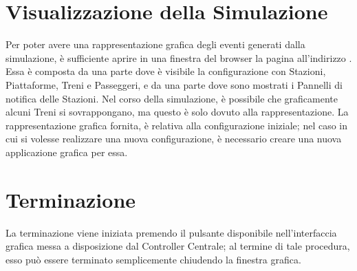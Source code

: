 	\section{Visualizzazione della Simulazione}
	
	Per poter avere una rappresentazione grafica degli eventi generati dalla simulazione, è sufficiente aprire in una finestra del browser  la pagina all'indirizzo . Essa è composta da una parte dove è visibile la configurazione con Stazioni, Piattaforme, Treni e Passeggeri, e da una parte dove sono mostrati i Pannelli di notifica delle Stazioni. Nel corso della simulazione, è possibile che graficamente alcuni Treni si sovrappongano, ma questo è solo dovuto alla rappresentazione.
	La rappresentazione grafica fornita, è relativa alla configurazione iniziale; nel caso in cui si volesse realizzare una nuova configurazione, è necessario creare una nuova applicazione grafica per essa.
	
	\section{Terminazione}
	
	La terminazione viene iniziata premendo il pulsante  disponibile nell'interfaccia grafica messa a disposizione dal Controller Centrale; al termine di tale procedura, esso può essere terminato semplicemente chiudendo la finestra grafica.
